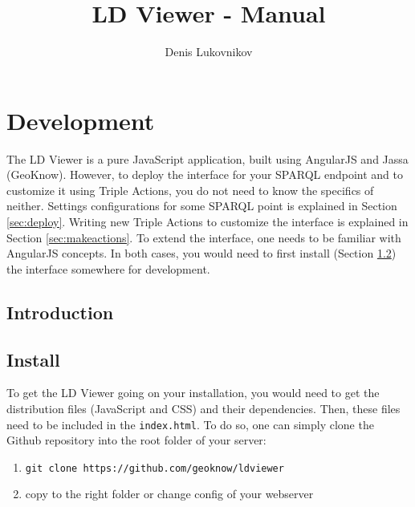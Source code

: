 \documentclass{book}
\begin{document}
\title{LD Viewer - Manual}
\author{Denis Lukovnikov}
\maketitle

\chapter{Development}
The LD Viewer is a pure JavaScript application, built using AngularJS and Jassa (GeoKnow).
However, to deploy the interface for your SPARQL endpoint and to customize it using Triple Actions, you do not need to know the specifics of neither.
Settings configurations for some SPARQL point is explained in Section \ref{sec:deploy}.
Writing new Triple Actions to customize the interface is explained in Section \ref{sec:makeactions}.
To extend the interface, one needs to be familiar with AngularJS concepts.
In both cases, you would need to first install (Section \ref{sec:install}) the interface somewhere for development.

\section{Introduction}
\label{sec:intro}

\section{Install}
\label{sec:install}
To get the LD Viewer going on your installation, you would need to get the distribution files (JavaScript and CSS) and their dependencies.
Then, these files need to be included in the \texttt{index.html}.
To do so, one can simply clone the Github repository into the root folder of your server:
\begin{enumerate}
\item \texttt{git clone https://github.com/geoknow/ldviewer}
\item copy to the right folder or change config of your webserver
\end{enumerate}
\end{document}
